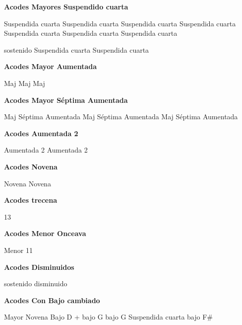 \vskip 20pt
\textbf{Acodes Mayores Suspendido cuarta}
\vskip 25pt

\small
{} Suspendida cuarta
 Suspendida cuarta
 Suspendida cuarta
 Suspendida cuarta
 Suspendida cuarta
 Suspendida cuarta
 Suspendida cuarta

 sostenido Suspendida cuarta
 Suspendida cuarta
\normalsize

\vskip 20pt
\textbf{Acodes Mayor Aumentada}
\vskip 25pt

\small
{} Maj
 Maj
 Maj
\normalsize

\vskip 20pt
\textbf{Acodes Mayor S\'eptima Aumentada}
\vskip 25pt

\small
{} Maj S\'eptima Aumentada
 Maj S\'eptima Aumentada
 Maj S\'eptima Aumentada
\normalsize

\vskip 20pt
\textbf{Acodes Aumentada 2}
\vskip 25pt

\small
{} Aumentada 2
 Aumentada 2
\normalsize

\vskip 20pt
\textbf{Acodes Novena}
\vskip 25pt

\small
{} Novena
 Novena
\normalsize

\vskip 20pt
\textbf{Acodes trecena}
\vskip 25pt

\small
{} 13
\normalsize

\vskip 20pt
\textbf{Acodes Menor Onceava}
\vskip 25pt

\small
{} Menor 11
\normalsize

\vskip 20pt
\textbf{Acodes Disminuidos}
\vskip 25pt

\small
{} sostenido disminuido
\normalsize


\vskip 20pt
\textbf{Acodes Con Bajo cambiado}

\small
{}
\vskip 20pt
\vskip 20pt
\vskip 20pt
\vskip 20pt
\vskip 20pt
 Mayor Novena Bajo D
\vskip 20pt
 + bajo G
 bajo G
\vskip 20pt
 Suspendida cuarta bajo F\#
\normalsize

